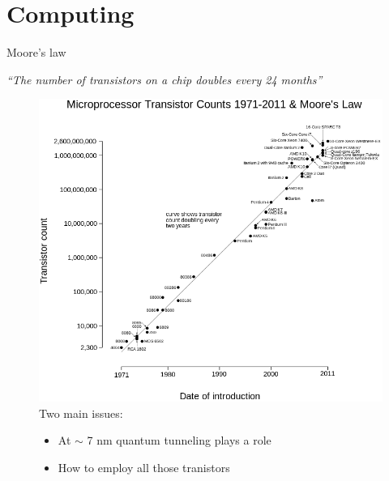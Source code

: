 \documentclass{beamer}
\begin{document}
\section{Computing}

\begin{frame}{Moore's law}
\begin{center}
\textit{``The number of transistors on a chip doubles every 24 months''}
\begin{figure}
\includegraphics[scale=0.25]{images/moores.png}\\
Two main issues:
\begin{itemize}
\item At $\sim$ 7 nm quantum tunneling plays a role
\item How to employ all those tranistors
\end{itemize}
\end{figure}
\end{center}
\end{frame}
\end{document}

